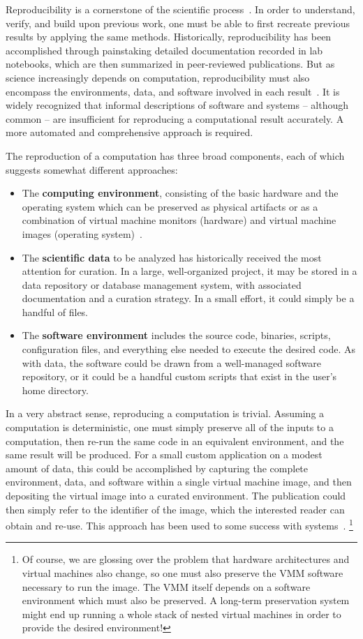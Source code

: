 \documentclass{sig-alternate}
\begin{document}
Reproducibility is a cornerstone of the scientific process~\cite{borgman2012data}.
In order to understand, verify, and build upon previous work,
one must be able to first recreate previous results by applying
the same methods. Historically, reproducibility has been
accomplished through painstaking detailed documentation recorded
in lab notebooks, which are then summarized in peer-reviewed publications.
But as science increasingly depends on computation,
reproducibility must also encompass the environments, data, and software
involved in each result~\cite{zabolitzky2002preserving}. It is widely recognized that informal
descriptions of software and systems -- although common -- are insufficient
for reproducing a computational result accurately.
A more automated and comprehensive approach is required.

The reproduction of a computation has three broad components,
each of which suggests somewhat different approaches:

\begin{itemize}
\item The {\bf computing environment}, consisting of the basic hardware and the operating system which can be preserved as physical artifacts or as a combination of virtual machine monitors (hardware) and virtual machine images (operating system)~\cite{matthews2009towards}.
\item The {\bf scientific data} to be analyzed has historically received the most attention for curation.  In a large, well-organized project, it may be stored in a  data repository or database management system, with associated documentation and a curation strategy.  In a small effort, it could simply be a handful of files.
\item The {\bf software environment} includes the source code, binaries, scripts, configuration files, and everything else needed to execute the desired code.  As with data, the software could be drawn from a well-managed software repository, or it could be a handful custom scripts that exist in the user's home directory.
\end{itemize}

In a very abstract sense, reproducing a computation is trivial.
Assuming a computation is deterministic, one must simply
preserve all of the inputs to a computation, then re-run
the same code in an equivalent environment, and the same result
will be produced.  For a small custom application on a modest
amount of data, this could be accomplished by capturing the
complete environment,
data, and software within a single virtual machine image,
and then depositing the virtual
image into a curated environment.  The publication could
then simply refer to the identifier of the image, which the
interested reader can obtain and re-use. This approach has
been used to some success with systems~\cite{castagne2013consider}.
\footnote{Of course, we are glossing over the problem that hardware
architectures and virtual machines also change, so one must also
preserve the VMM software necessary to run the image.  The VMM itself
depends on a software environment which must also be preserved.
A long-term preservation system might end up running a whole
stack of nested virtual machines in order to provide the desired
environment! }
\end{document}
